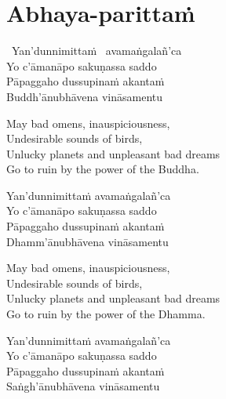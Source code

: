 \suttaRef{[Thai]}



\section{Abhaya-parittaṁ}
\label{abhaya-parittam}

\begin{pali-hangtogether}
  \anglebracketleft\ \hspace{-0.5mm}Yan'dunnimittaṁ \hspace{-0.5mm}\anglebracketright\ avamaṅgalañ'ca\\
  Yo c'āmanāpo sakuṇassa saddo\\
  Pāpaggaho dussupinaṁ akantaṁ\\
  Buddh'ānubhāvena vināsamentu
\end{pali-hangtogether}

\begin{english-verses}
  May bad omens, inauspiciousness,\\
  Undesirable sounds of birds,\\
  Unlucky planets and unpleasant bad dreams\\
  Go to ruin by the power of the Buddha.
\end{english-verses}

\begin{pali-hang-continued}
  Yan'dunnimittaṁ avamaṅgalañ'ca\\
  Yo c'āmanāpo sakuṇassa saddo\\
  Pāpaggaho dussupinaṁ akantaṁ\\
  Dhamm'ānubhāvena vināsamentu
\end{pali-hang-continued}

\begin{english-verses}
  May bad omens, inauspiciousness,\\
  Undesirable sounds of birds,\\
  Unlucky planets and unpleasant bad dreams\\
  Go to ruin by the power of the Dhamma.
\end{english-verses}

\begin{pali-hang-continued}
  Yan'dunnimittaṁ avamaṅgalañ'ca\\
  Yo c'āmanāpo sakuṇassa saddo\\
  Pāpaggaho dussupinaṁ akantaṁ\\
  Saṅgh'ānubhāvena vināsamentu
\end{pali-hang-continued}

